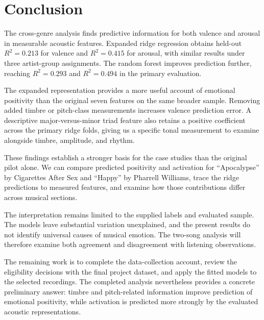 \section{Conclusion}
\label{sec:conclusion}

The cross-genre analysis finds predictive information for both valence and arousal in measurable acoustic features. Expanded ridge regression obtains held-out $R^2=0.213$ for valence and $R^2=0.415$ for arousal, with similar results under three artist-group assignments. The random forest improves prediction further, reaching $R^2=0.293$ and $R^2=0.494$ in the primary evaluation.

The expanded representation provides a more useful account of emotional positivity than the original seven features on the same broader sample. Removing added timbre or pitch-class measurements increases valence prediction error. A descriptive major-versus-minor triad feature also retains a positive coefficient across the primary ridge folds, giving us a specific tonal measurement to examine alongside timbre, amplitude, and rhythm.

These findings establish a stronger basis for the case studies than the original pilot alone. We can compare predicted positivity and activation for ``Apocalypse'' by Cigarettes After Sex and ``Happy'' by Pharrell Williams, trace the ridge predictions to measured features, and examine how those contributions differ across musical sections.

The interpretation remains limited to the supplied labels and evaluated sample. The models leave substantial variation unexplained, and the present results do not identify universal causes of musical emotion. The two-song analysis will therefore examine both agreement and disagreement with listening observations.

The remaining work is to complete the data-collection account, review the eligibility decisions with the final project dataset, and apply the fitted models to the selected recordings. The completed analysis nevertheless provides a concrete preliminary answer: timbre and pitch-related information improve prediction of emotional positivity, while activation is predicted more strongly by the evaluated acoustic representations.
